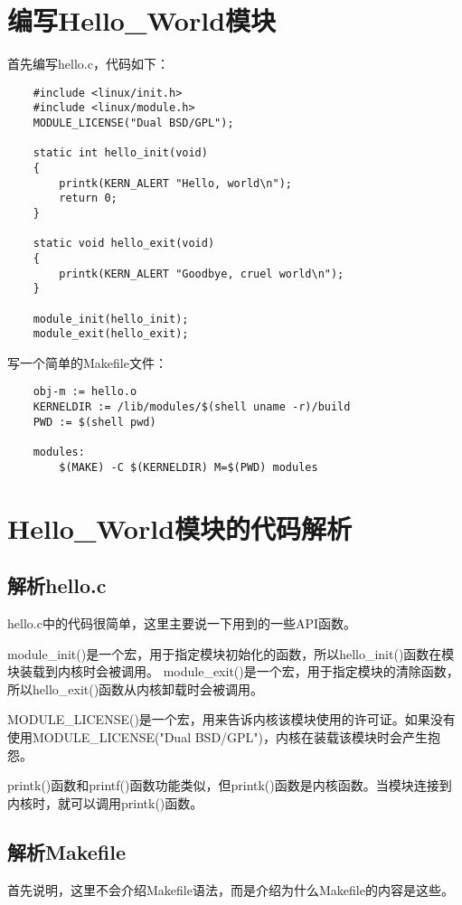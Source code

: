 \documentclass[a4paper,left=2.5cm,right=2.5cm,11pt]{article}
\begin{document}


\section{编写Hello\_World模块}
	首先编写hello.c，代码如下：
	\begin{lstlisting}
	#include <linux/init.h> 
	#include <linux/module.h> 
	MODULE_LICENSE("Dual BSD/GPL"); 

	static int hello_init(void) 
	{ 
		printk(KERN_ALERT "Hello, world\n"); 
		return 0; 
	} 

	static void hello_exit(void) 
	{ 
		printk(KERN_ALERT "Goodbye, cruel world\n"); 
	} 

	module_init(hello_init); 
	module_exit(hello_exit); 
	\end{lstlisting}

	写一个简单的Makefile文件：
	\begin{lstlisting}
	obj-m := hello.o
	KERNELDIR := /lib/modules/$(shell uname -r)/build
	PWD := $(shell pwd)

	modules:
		$(MAKE) -C $(KERNELDIR) M=$(PWD) modules
	\end{lstlisting}

\section{Hello\_World模块的代码解析}
\subsection{解析hello.c}
	hello.c中的代码很简单，这里主要说一下用到的一些API函数。\par
	module\_init()是一个宏，用于指定模块初始化的函数，所以hello\_init()函数在模块装载到内核时会被调用。
	module\_exit()是一个宏，用于指定模块的清除函数，所以hello\_exit()函数从内核卸载时会被调用。\par

	MODULE\_LICENSE()是一个宏，用来告诉内核该模块使用的许可证。如果没有使用MODULE\_LICENSE("Dual BSD/GPL")，内核在装载该模块时会产生抱怨。\par

	printk()函数和printf()函数功能类似，但printk()函数是内核函数。当模块连接到内核时，就可以调用printk()函数。


\subsection{解析Makefile}
	首先说明，这里不会介绍Makefile语法，而是介绍为什么Makefile的内容是这些。\par
\end{document}
